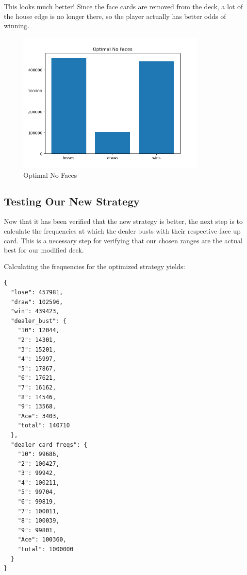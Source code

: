 \documentclass{article}
\begin{document}
{		This looks much better! Since the face cards are removed from the deck, a lot of the house edge is no longer there,
		so the player actually has better odds of winning.

		\begin{figure}[H]
			\hypertarget{fig4}{}
			\begin{center}
				\includegraphics[width=9.5cm]{optimal-no-faces.png}
			\end{center}
			\vspace{-10mm}
			\caption{Optimal No Faces}
		\end{figure}
        
        \subsection{Testing Our New Strategy}
        \label{Testing Our New Strategy}
		
		Now that it has been verified that the new strategy is better, the next step is to calculate the frequencies
		at which the dealer busts with their respective face up card. This is a necessary step for verifying that our 
		chosen ranges are the actual best for our modified deck.

		Calculating the frequencies for the optimized strategy yields:

        \begin{verbatim}
{
  "lose": 457981,
  "draw": 102596,
  "win": 439423,
  "dealer_bust": {
    "10": 12044,
    "2": 14301,
    "3": 15201,
    "4": 15997,
    "5": 17867,
    "6": 17621,
    "7": 16162,
    "8": 14546,
    "9": 13568,
    "Ace": 3403,
    "total": 140710
  },
  "dealer_card_freqs": {
    "10": 99686,
    "2": 100427,
    "3": 99942,
    "4": 100211,
    "5": 99704,
    "6": 99819,
    "7": 100011,
    "8": 100039,
    "9": 99801,
    "Ace": 100360,
    "total": 1000000
  }
}
        \end{verbatim}

}
\end{document}
